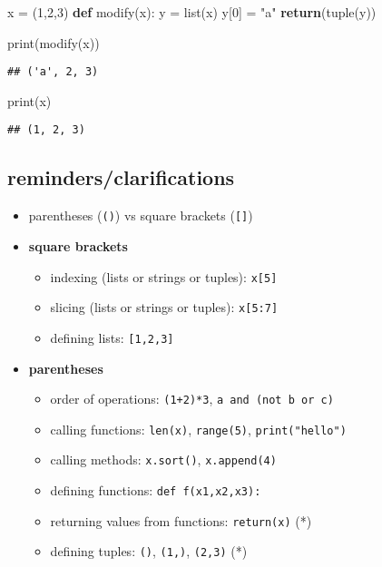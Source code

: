\documentclass[]{tufte-handout}
\newenvironment{Shaded}{}{}
\newcommand{\KeywordTok}[1]{\textcolor[rgb]{0.00,0.44,0.13}{\textbf{{#1}}}}
\newcommand{\DecValTok}[1]{\textcolor[rgb]{0.25,0.63,0.44}{{#1}}}
\newcommand{\StringTok}[1]{\textcolor[rgb]{0.25,0.44,0.63}{{#1}}}
\newcommand{\ControlFlowTok}[1]{\textcolor[rgb]{0.00,0.44,0.13}{\textbf{{#1}}}}
\newcommand{\OperatorTok}[1]{\textcolor[rgb]{0.40,0.40,0.40}{{#1}}}
\newcommand{\BuiltInTok}[1]{{#1}}
\newcommand{\NormalTok}[1]{{#1}}
\providecommand{\tightlist}{%
  \setlength{\itemsep}{0pt}\setlength{\parskip}{0pt}}
\begin{document}
\begin{Shaded}
\begin{Highlighting}[]
\NormalTok{x }\OperatorTok{=} \NormalTok{(}\DecValTok{1}\NormalTok{,}\DecValTok{2}\NormalTok{,}\DecValTok{3}\NormalTok{)}
\KeywordTok{def} \NormalTok{modify(x):}
    \NormalTok{y }\OperatorTok{=} \BuiltInTok{list}\NormalTok{(x)}
    \NormalTok{y[}\DecValTok{0}\NormalTok{] }\OperatorTok{=} \StringTok{"a"}
    \ControlFlowTok{return}\NormalTok{(}\BuiltInTok{tuple}\NormalTok{(y))}

\BuiltInTok{print}\NormalTok{(modify(x))}
\end{Highlighting}
\end{Shaded}

\begin{verbatim}
## ('a', 2, 3)
\end{verbatim}

\begin{Shaded}
\begin{Highlighting}[]
\BuiltInTok{print}\NormalTok{(x)}
\end{Highlighting}
\end{Shaded}

\begin{verbatim}
## (1, 2, 3)
\end{verbatim}

\subsection{reminders/clarifications}\label{remindersclarifications}

\begin{itemize}
\tightlist
\item
  parentheses (\texttt{()}) vs square brackets (\texttt{{[}{]}})
\item
  \textbf{square brackets}

  \begin{itemize}
  \tightlist
  \item
    indexing (lists or strings or tuples): \texttt{x{[}5{]}}
  \item
    slicing (lists or strings or tuples): \texttt{x{[}5:7{]}}
  \item
    defining lists: \texttt{{[}1,2,3{]}}
  \end{itemize}
\item
  \textbf{parentheses}

  \begin{itemize}
  \tightlist
  \item
    order of operations: \texttt{(1+2)*3},
    \texttt{a\ and\ (not\ b\ or\ c)}
  \item
    calling functions: \texttt{len(x)}, \texttt{range(5)},
    \texttt{print("hello")}
  \item
    calling methods: \texttt{x.sort()}, \texttt{x.append(4)}
  \item
    defining functions: \texttt{def\ f(x1,x2,x3):}
  \item
    returning values from functions: \texttt{return(x)} (*)
  \item
    defining tuples: \texttt{()}, \texttt{(1,)}, \texttt{(2,3)} (*)
  \end{itemize}
\end{itemize}
\end{document}
